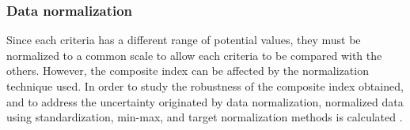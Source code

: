 \begin{refsection}[referencesCh4]
\subsubsection{Data normalization}
Since each criteria has a different range of potential values, they must be normalized to a common scale to allow each criteria to be compared with the others. However, the composite index can be affected by the normalization technique used. In order to study the robustness of the composite index obtained, and to address the uncertainty originated by data normalization, normalized data using standardization, min-max, and target normalization methods is calculated \citep{HandbookCompositeIndicators}.

\begin{table}[p]
	\centering
	\caption{Criteria preference as a function of the GIS-based environmental indicators for nutrient pollution.} \label{table:criteria_preference}
\end{table}
\end{refsection}
